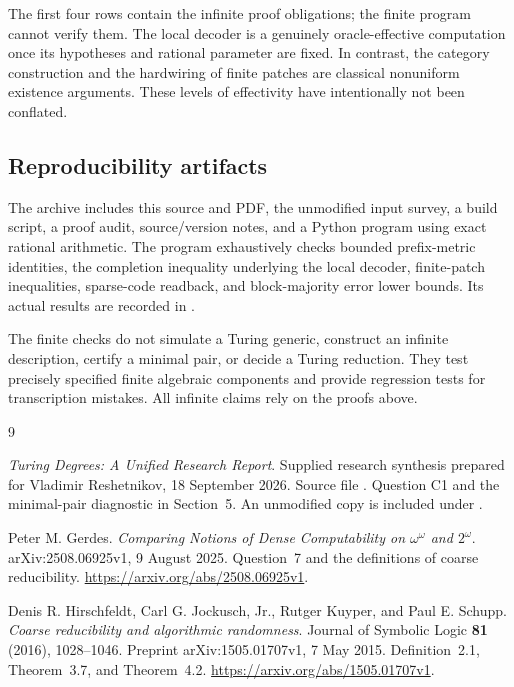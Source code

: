 \documentclass[11pt,a4paper]{article}
\theoremstyle{definition}\newtheorem{definition}[theorem]{Definition}
\theoremstyle{remark}\newtheorem{remark}[theorem]{Remark}
\begin{document}
The first four rows contain the infinite proof obligations; the finite program cannot verify them. The local decoder is a genuinely oracle-effective computation once its hypotheses and rational parameter are fixed. In contrast, the category construction and the hardwiring of finite patches are classical nonuniform existence arguments. These levels of effectivity have intentionally not been conflated.

\subsection{Reproducibility artifacts}
The archive includes this source and PDF, the unmodified input survey, a build script, a proof audit, source/version notes, and a Python program using exact rational arithmetic. The program exhaustively checks bounded prefix-metric identities, the completion inequality underlying the local decoder, finite-patch inequalities, sparse-code readback, and block-majority error lower bounds. Its actual results are recorded in .

The finite checks do not simulate a Turing generic, construct an infinite description, certify a minimal pair, or decide a Turing reduction. They test precisely specified finite algebraic components and provide regression tests for transcription mistakes. All infinite claims rely on the proofs above.

\clearpage
\begin{thebibliography}{9}
\raggedright
{}
\emph{Turing Degrees: A Unified Research Report}.
Supplied research synthesis prepared for Vladimir Reshetnikov,
18 September 2026. Source file .
Question C1 and the minimal-pair diagnostic in Section~5.
An unmodified copy is included under .

Peter M. Gerdes.
\emph{Comparing Notions of Dense Computability on $\omega^\omega$ and $2^\omega$}.
arXiv:2508.06925v1, 9 August 2025.
Question~7 and the definitions of coarse reducibility.
\url{https://arxiv.org/abs/2508.06925v1}.

Denis R. Hirschfeldt, Carl G. Jockusch, Jr., Rutger Kuyper,
and Paul E. Schupp.
\emph{Coarse reducibility and algorithmic randomness}.
Journal of Symbolic Logic \textbf{81} (2016), 1028--1046.
Preprint arXiv:1505.01707v1, 7 May 2015.
Definition~2.1, Theorem~3.7, and Theorem~4.2.
\url{https://arxiv.org/abs/1505.01707v1}.
\end{thebibliography}
\end{document}
